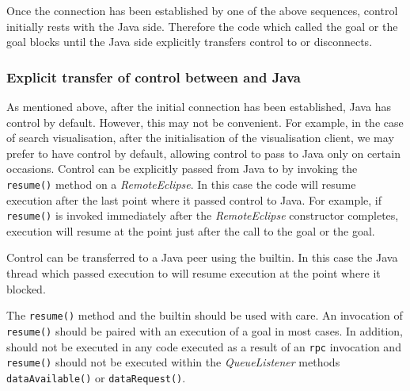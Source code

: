 Once the connection has been established by one of the above
sequences, control initially rests with the Java side. Therefore the
{\eclipse} code which called the  goal or the
 goal blocks until the Java side
explicitly transfers control to {\eclipse} or disconnects.

\subsubsection{Explicit transfer of control between {\eclipse} and Java}
\label{sec:ji-remote-control-transfer}

As mentioned above, after the initial connection has been established,
Java has control by default. However, this may not be convenient. For
example, in the case of search visualisation, after the initialisation
of the visualisation client, we may prefer {\eclipse} to have control
by default, allowing control to pass to Java only on certain
occasions. Control can be explicitly passed from Java to {\eclipse} by
invoking the {\tt resume()} method on a {\it RemoteEclipse}. In this
case the {\eclipse} code will resume execution after the last point where
it passed control to Java. For example, if {\tt resume()} is invoked
immediately after the {\it RemoteEclipse} constructor completes,
{\eclipse} execution will resume at the point just after the call to
the  goal or the 
goal.

Control can be transferred to a Java peer using the 
builtin. In this case the Java thread which passed execution to
{\eclipse} will resume execution at the point where it blocked.

The {\tt resume()} method and the  builtin should be
used with care. An invocation of {\tt resume()} should be paired with
an execution of a  goal in most cases. In addition,
 should not be executed in any code executed as a
result of an {\tt rpc} invocation and {\tt resume()} should not be
executed within the {\it QueueListener} methods {\tt dataAvailable()}
or {\tt dataRequest()}.

